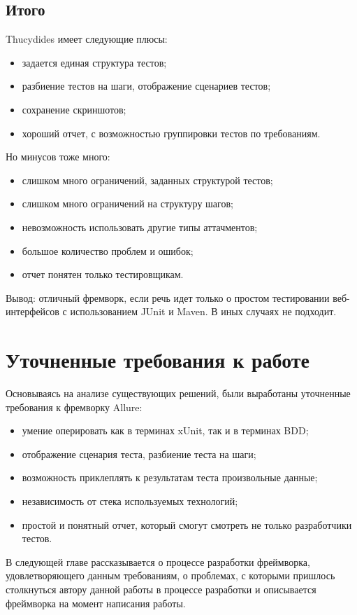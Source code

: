 \subsection{Итого} 

Thucydides имеет следующие плюсы: 
\begin{itemize}
\item задается единая структура тестов;
\item разбиение тестов на шаги, отображение сценариев тестов;
\item сохранение скриншотов;
\item хороший отчет, с возможностью группировки тестов по требованиям.
\end{itemize}

Но минусов тоже много:
\begin{itemize}
\item слишком много ограничений, заданных структурой тестов;
\item слишком много ограничений на структуру шагов;
\item невозможность использовать другие типы аттачментов;
\item большое количество проблем и ошибок;
\item отчет понятен только тестировщикам.
\end{itemize}

Вывод: отличный фремворк, если речь идет только о простом тестировании веб-интерфейсов с использованием JUnit и Maven. В иных случаях не подходит.

\section{Уточненные требования к работе}

Основываясь на анализе существующих решений, были выработаны уточненные требования к фремворку Allure:

\begin{itemize}
\item умение оперировать как в терминах xUnit, так и в терминах BDD;
\item отображение сценария теста, разбиение теста на шаги;
\item возможность приклеплять к результатам теста произвольные данные;
\item независимость от стека используемых технологий;
\item простой и понятный отчет, который смогут смотреть не только разработчики тестов.
\end{itemize}

В следующей главе рассказывается о процессе разработки фреймворка, удовлетворяющего данным требованиям, о проблемах, с которыми пришлось столкнуться автору данной работы в процессе разработки и описывается фреймворка на момент написания работы.